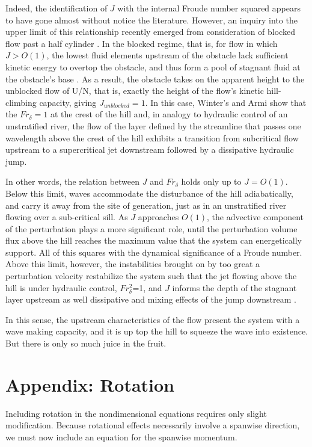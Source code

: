 \documentclass[12pt]{article}
\begin{document}
	Indeed, the identification of $J$ with the internal Froude number squared appears to have gone almost without notice the literature. However, an inquiry into the upper limit of this relationship recently emerged from consideration of blocked flow past a half cylinder \citep{Winters2012}. In the blocked regime, that is, for flow in which $J>O(1)$, the lowest fluid elements upstream of the obstacle lack sufficient kinetic energy to overtop the obstacle, and thus form a pool of stagnant fluid at the obstacle's base \citep{Baines1995}. As a result, the obstacle takes on the apparent height to the unblocked flow of U/N, that is, exactly the height of the flow's kinetic hill-climbing capacity, giving $J_{unblocked}=1$. In this case, Winter's and Armi show that the $Fr_{\delta}=1$ at the crest of the hill and, in analogy to hydraulic control of an unstratified river, the flow of the layer defined by the streamline that passes one wavelength above the crest of the hill exhibits a transition from subcritical flow upstream to a supercritical jet downstream followed by a dissipative hydraulic jump. 
	
	In other words, the relation between $J$ and $Fr_{\delta}$ holds only up to $J=O(1)$. Below this limit, waves accommodate the disturbance of the hill adiabatically, and carry it away from the site of generation, just as in an unstratified river flowing over a sub-critical sill. As $J$ approaches $O(1)$, the advective component of the perturbation plays a more significant role, until the perturbation volume flux above the hill reaches the maximum value that the system can energetically support. All of this squares with the dynamical significance of a Froude number. Above this limit, however, the instabilities brought on by too great a perturbation velocity restabilize the system such that the jet flowing above the hill is under hydraulic control, $Fr_{\delta}^2$=1, and $J$ informs the depth of the stagnant layer upstream as well dissipative and mixing effects of the jump downstream \citep{Winters2012}. 
	
	In this sense, the upstream characteristics of the flow present the system with a wave making capacity, and it is up top the hill to squeeze the wave into existence. But there is only so much juice in the fruit. 
	
\section{Appendix: Rotation}
Including rotation in the nondimensional equations requires only slight modification. Because rotational effects necessarily involve a spanwise direction, we must now include an equation for the spanwise momentum. 
\end{document}
